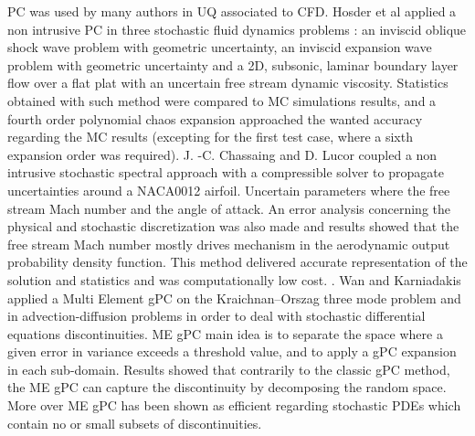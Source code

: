 \documentclass[11pt, a4paper, English]{report}
\begin{document}
PC was used by many authors in UQ associated to CFD. Hosder et al \cite{Hosder} applied a non intrusive PC in three stochastic fluid dynamics problems : an inviscid oblique shock wave problem with geometric uncertainty, an inviscid expansion wave problem with geometric uncertainty and a 2D, subsonic, laminar boundary layer flow over a flat plat with an uncertain free stream dynamic viscosity. Statistics obtained with such method were compared to MC simulations results, and a fourth order polynomial chaos expansion approached the wanted accuracy regarding the MC results (excepting for the first test case, where a sixth expansion order was required). J. -C. Chassaing and D. Lucor \cite{JC} coupled a non intrusive stochastic spectral approach with a compressible solver to propagate uncertainties around a NACA0012 airfoil. Uncertain parameters where the free stream Mach number and the angle of attack. An error analysis concerning the physical and stochastic discretization was also made and results showed that the free stream Mach number mostly drives mechanism in the aerodynamic output probability density function. This method delivered accurate representation of the solution and statistics and was computationally low cost. \cite{sto1}. Wan and Karniadakis \cite{wan&karnia} applied a Multi Element gPC on the Kraichnan–Orszag three mode problem and in advection-diffusion problems in order to deal with stochastic differential equations discontinuities. ME gPC main idea is to separate the space where a given error in variance exceeds a threshold value, and to apply a gPC expansion in each sub-domain. Results showed that contrarily to the classic gPC method, the ME gPC can capture the discontinuity by decomposing the random space. More over ME gPC has been shown as efficient regarding stochastic PDEs which contain no or small subsets of discontinuities.
\end{document}
